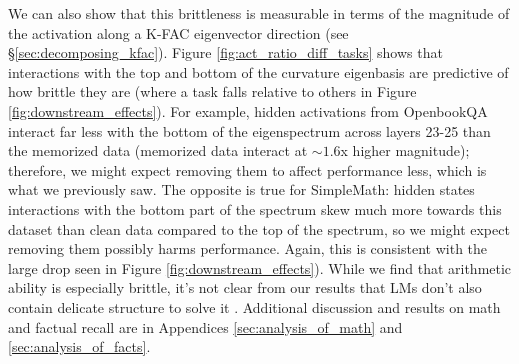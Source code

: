 \documentclass{article} %
\begin{document}
We can also show that this brittleness is measurable in terms of the magnitude of the activation along a K-FAC eigenvector direction (see \S \ref{sec:decomposing_kfac}). Figure \ref{fig:act_ratio_diff_tasks} shows that interactions with the top and bottom of the curvature eigenbasis are predictive of how brittle they are (where a task falls relative to others in Figure \ref{fig:downstream_effects}). For example, hidden activations from OpenbookQA interact far less with the bottom of the eigenspectrum across layers 23-25 than the memorized data (memorized data interact at $\sim 1.6$x higher magnitude); therefore, we might expect removing them to affect performance less, which is what we previously saw. The opposite is true for SimpleMath: hidden states interactions with the bottom part of the spectrum skew much more towards this dataset than clean data compared to the top of the spectrum, so we might expect removing them possibly harms performance. Again, this is consistent with the large drop seen in Figure \ref{fig:downstream_effects}). While we find that arithmetic ability is especially brittle, it's not clear from our results that LMs don't also contain delicate structure to solve it \citep{kantamneni2025language}. Additional discussion and results on math and factual recall are in Appendices \ref{sec:analysis_of_math} and \ref{sec:analysis_of_facts}.
\end{document}
